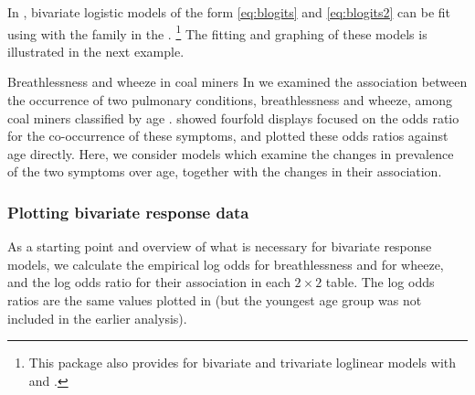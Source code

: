 \documentclass[11pt]{book}\usepackage[]{graphicx}\usepackage[]{color}
\begin{document}
In \R, bivariate logistic models of the form \eqref{eq:blogits} and
\eqref{eq:blogits2} can be fit using  with
the  family in the .%
\footnote{
This package also provides for bivariate and trivariate loglinear models
with  and .
}
The fitting and graphing of these models is illustrated in the
next example.


\begin{Example}[coalminers]{Breathlessness and wheeze in coal miners}
In  we examined the association between the occurrence
of two pulmonary conditions, breathlessness and wheeze,
among coal miners classified by age \citep{AshfordSowden:70}.
 showed fourfold displays focused on the odds ratio
for the co-occurrence of these symptoms,
and  plotted these odds ratios against age directly.
Here, we consider models which examine the changes in prevalence of
the two symptoms over age, together with the changes in their association.

\subsubsection*{Plotting bivariate response data}
As a starting point and overview of what is necessary for
bivariate response models,
we calculate the empirical log odds for breathlessness and for
wheeze, and the log odds ratio for their association
in each $2 \times 2$ table.
The log odds ratios are the same values plotted in 
(but the youngest age group was not included in the earlier analysis).


\end{Example}
\end{document}
